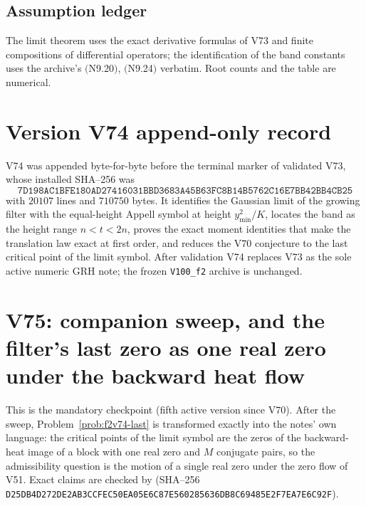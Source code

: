 \documentclass[11pt]{article}
\theoremstyle{definition}
\theoremstyle{remark}
\begin{document}
\subsection*{Assumption ledger}
\label{ass:f2v74}
The limit theorem uses the exact derivative formulas of V73 and finite
compositions of differential operators; the identification of the band
constants uses the archive's \((\)N9.20\()\), \((\)N9.24\()\) verbatim.
Root counts and the table are numerical.
\endgroup

\section*{Version V74 append-only record}

V74 was appended byte-for-byte before the terminal marker of validated
V73, whose installed SHA--256 was
\[
 \texttt{7D198AC1BFE180AD27416031BBD3683A}
 \allowbreak\texttt{45B63FC8B14B5762C16E7BB42BB4CB25}
\]
with \(20107\) lines and \(710750\) bytes.  It identifies the Gaussian
limit of the growing filter with the equal-height Appell symbol at
height \(y_{\min}^2/K\), locates the band as the height range
\(n<t<2n\), proves the exact moment identities that make the translation
law exact at first order, and reduces the V70 conjecture to the last
critical point of the limit symbol.  After validation V74 replaces V73
as the sole active numeric GRH note; the frozen \texttt{V100\_f2}
archive is unchanged.





\clearpage
\section{V75: companion sweep, and the filter's last zero as one real zero under the backward heat flow}
\label{sec:f2v75-flow}
\begingroup
\setcounter{equation}{0}
\renewcommand{\theequation}{N75.\arabic{equation}}
\renewcommand{\theHequation}{f2v75.\arabic{equation}}

This is the mandatory checkpoint (fifth active version since V70).  After
the sweep, Problem~\ref{prob:f2v74-last} is transformed exactly into the
notes' own language: the critical points of the limit symbol are the
zeros of the backward-heat image of a block with one real zero and
\(M\) conjugate pairs, so the admissibility question is the motion of a
single real zero under the zero flow of V51.  Exact claims are checked by
 (SHA--256
\texttt{D25DB4D272DE2AB3CCFEC50EA05E6C87}\allowbreak\texttt{E560285636DB8C69485E2F7EA7E6C92F}).
\end{document}

